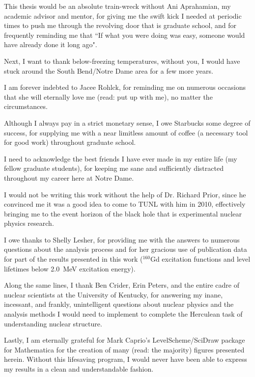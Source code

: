 \documentclass[final,noinfo,sort&compress]{nddiss2e}
\begin{document}
 \begin{acknowledge}
   This thesis would be an absolute train-wreck without Ani Aprahamian, my academic advisor and mentor, for giving me the swift kick I needed at periodic times to push me through the revolving door that is graduate school, and for frequently reminding me that ``If what you were doing was easy, someone would have already done it long ago". 
    
  Next, I want to thank below-freezing temperatures, without you, I would have stuck around the South Bend/Notre Dame area for a few more years.
  
  I am forever indebted to Jacee Rohlck, for reminding me on numerous occasions that she will eternally love me (read: put up with me), no matter the circumstances.
  
  Although I always pay in a strict monetary sense, I owe Starbucks some degree of success, for supplying me with a near limitless amount of coffee (a necessary tool for good work) throughout graduate school.
  
  I need to acknowledge the best friends I have ever made in my entire life (my fellow graduate students), for keeping me sane and sufficiently distracted throughout my career here at Notre Dame.
  
  I would not be writing this work without the help of Dr. Richard Prior, since he convinced me it was a good idea to come to TUNL with him in 2010, effectively bringing me to the event horizon of the black hole that is experimental nuclear physics research.
  
  I owe thanks to Shelly Lesher, for providing me with the answers to numerous questions about the analysis process and for her gracious use of publication data for part of the results presented in this work ($^{160}$Gd excitation functions and level lifetimes below 2.0~MeV excitation energy).
  
  Along the same lines, I thank Ben Crider, Erin Peters, and the entire cadre of nuclear scientists at the University of Kentucky, for answering my inane, incessant, and frankly, unintelligent questions about nuclear physics and the analysis methods I would need to implement to complete the Herculean task of understanding nuclear structure.

  Lastly, I am eternally grateful for Mark Caprio's LevelScheme/SciDraw package for Mathematica for the creation of many (read: the majority) figures presented herein. Without this lifesaving program, I would never have been able to express my results in a clean and understandable fashion.
  



 \end{acknowledge}
\end{document}
